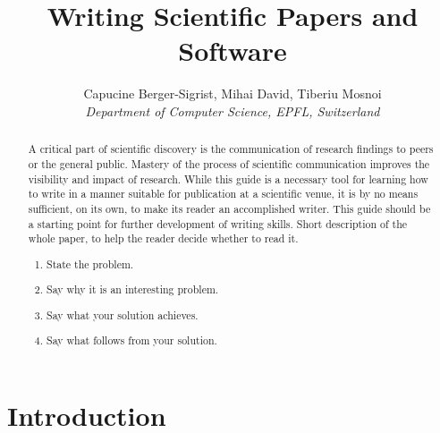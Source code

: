 \documentclass[10pt,conference,compsocconf]{IEEEtran}
\begin{document}
\title{Writing Scientific Papers and Software}

\author{
  Capucine Berger-Sigrist, Mihai David, Tiberiu Mosnoi\\
  \textit{Department of Computer Science, EPFL, Switzerland}
}

\maketitle
\begin{abstract}
A critical part of scientific discovery is the
communication of research findings to peers or the general public.
Mastery of the process of scientific communication improves the
visibility and impact of research. While this guide is a necessary
tool for learning how to write in a manner suitable for publication
at a scientific venue, it is by no means sufficient, on its own, to
make its reader an accomplished writer. 
This guide should be a starting point for further development of 
writing skills.
Short description of the whole paper, to help the
reader decide whether to read it. ~\cite{higgsMLdoc}
\begin{enumerate}
    \item State the problem.
    \item Say why it is an interesting problem.
    \item Say what your solution achieves.
    \item Say what follows from your solution.
\end{enumerate}
\end{abstract}

\section{Introduction}

\end{document}
